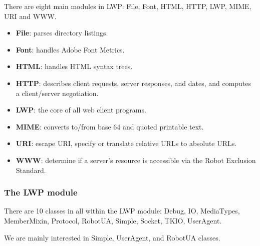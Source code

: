 \documentclass[a4paper]{article}
\begin{document}
There are eight main modules in LWP: File, Font, HTML, HTTP, LWP, MIME, URI and WWW.
\begin{itemize}
  \item \textbf{File}: parses directory listings.
  \item \textbf{Font}: handles Adobe Font Metrics.
  \item \textbf{HTML}: handles HTML syntax trees.
  \item \textbf{HTTP}: describes client requests, server responses, and dates, and computes a client/server negotiation.
  \item \textbf{LWP}: the core of all web client programs.
  \item \textbf{MIME}: converts to/from base 64 and quoted printable text.
  \item \textbf{URI}: escape URI, specify or translate relative URLs to absolute URLs.
  \item \textbf{WWW}: determine if a server's resource is accessible via the Robot Exclusion Standard.
\end{itemize}

\subsubsection{The LWP module}

There are 10 classes in all within the LWP module: Debug, IO, MediaTypes, MemberMixin, Protocol, RobotUA, Simple, Socket, TKIO, UserAgent.

We are mainly interested in Simple, UserAgent, and RobotUA classes.
\end{document}
